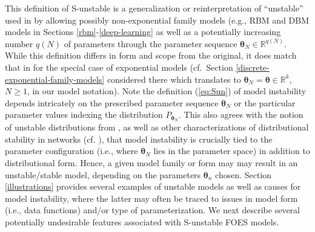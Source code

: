 \documentclass[numbib]{imamat}
\theoremstyle{theorem}
\theoremstyle{lemma}
\theoremstyle{example}
\theoremstyle{corollary}
\theoremstyle{definition}
\theoremstyle{remark}
\theoremstyle{approximation}
\theoremstyle{scheme}
\newcommand{\ak}[1]{{\color{blue} #1}}
\begin{document}
This definition of S-unstable is a generalization or reinterpretation of ``unstable'' used in \citet{schweinberger2011instability} by allowing possibly non-exponential family models (e.g., RBM and DBM models in Sections \ref{rbm}-\ref{deep-learning} as well as a potentially increasing number \(q(N)\) of parameters through the parameter sequence \(\boldsymbol \theta_N\in \mathbb{R}^{q(N)}\). While this definition differs in form and scope from the original, it does match that in \citet{schweinberger2011instability} for the special case of exponential models (cf.~Section \ref{discrete-exponential-family-models} considered there \ak{which translates to $\boldsymbol{\theta}_N=\boldsymbol{\theta} \in \mathbb{R}^k$, $N \geq 1$, in our model notation). Note the definition (\ref{eq:Sun}) of model instability depends intricately on the prescribed parameter sequence $\boldsymbol{\theta}_N$ or the particular parameter values indexing the distribution $P_{\boldsymbol{\theta}_N}$. This also agrees with the notion of unstable distributions from
\citet{schweinberger2011instability}, as well as other characterizations of distributional stability in networks (cf. \citet{handcock2003assessing}), that model instability is crucially tied to the parameter configuration (i.e., where $\boldsymbol{\theta}_N$ lies in the parameter space) in addition to distributional form.  Hence, a given model family or form may may result in an unstable/stable model, depending on the parameters $\boldsymbol{\theta}_n$ chosen.} Section \ref{illustrations} provides several examples of unstable models as well as causes for model instability, where the latter may often be traced to issues in model form (i.e., data functions) and/or \ak{type of} parameterization. We next describe several potentially undesirable features associated with S-unstable FOES models.
\end{document}
